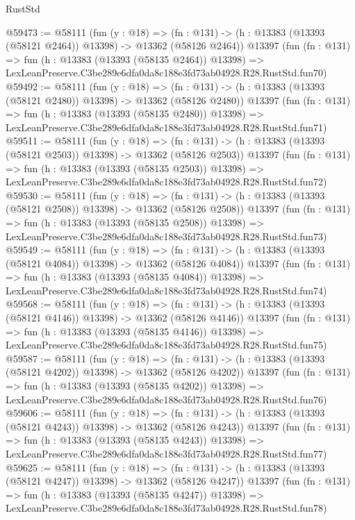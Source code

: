 \begin{lexlean}{RustStd}
\begin{coremodule}
@59473 := @58111
    (fun (y : @18) =>
    (fn : @131) -> (h : @13383 (@13393 (@58121 @2464)) @13398) -> @13362 (@58126 @2464))
    @13397
    (fun (fn : @131) =>
    fun (h : @13383 (@13393 (@58135 @2464)) @13398) =>
    LexLeanPreserve.C3be289e6dfa0da8c188e3fd73ab04928.R28.RustStd.fun70)
@59492 := @58111
    (fun (y : @18) =>
    (fn : @131) -> (h : @13383 (@13393 (@58121 @2480)) @13398) -> @13362 (@58126 @2480))
    @13397
    (fun (fn : @131) =>
    fun (h : @13383 (@13393 (@58135 @2480)) @13398) =>
    LexLeanPreserve.C3be289e6dfa0da8c188e3fd73ab04928.R28.RustStd.fun71)
@59511 := @58111
    (fun (y : @18) =>
    (fn : @131) -> (h : @13383 (@13393 (@58121 @2503)) @13398) -> @13362 (@58126 @2503))
    @13397
    (fun (fn : @131) =>
    fun (h : @13383 (@13393 (@58135 @2503)) @13398) =>
    LexLeanPreserve.C3be289e6dfa0da8c188e3fd73ab04928.R28.RustStd.fun72)
@59530 := @58111
    (fun (y : @18) =>
    (fn : @131) -> (h : @13383 (@13393 (@58121 @2508)) @13398) -> @13362 (@58126 @2508))
    @13397
    (fun (fn : @131) =>
    fun (h : @13383 (@13393 (@58135 @2508)) @13398) =>
    LexLeanPreserve.C3be289e6dfa0da8c188e3fd73ab04928.R28.RustStd.fun73)
@59549 := @58111
    (fun (y : @18) =>
    (fn : @131) -> (h : @13383 (@13393 (@58121 @4084)) @13398) -> @13362 (@58126 @4084))
    @13397
    (fun (fn : @131) =>
    fun (h : @13383 (@13393 (@58135 @4084)) @13398) =>
    LexLeanPreserve.C3be289e6dfa0da8c188e3fd73ab04928.R28.RustStd.fun74)
@59568 := @58111
    (fun (y : @18) =>
    (fn : @131) -> (h : @13383 (@13393 (@58121 @4146)) @13398) -> @13362 (@58126 @4146))
    @13397
    (fun (fn : @131) =>
    fun (h : @13383 (@13393 (@58135 @4146)) @13398) =>
    LexLeanPreserve.C3be289e6dfa0da8c188e3fd73ab04928.R28.RustStd.fun75)
@59587 := @58111
    (fun (y : @18) =>
    (fn : @131) -> (h : @13383 (@13393 (@58121 @4202)) @13398) -> @13362 (@58126 @4202))
    @13397
    (fun (fn : @131) =>
    fun (h : @13383 (@13393 (@58135 @4202)) @13398) =>
    LexLeanPreserve.C3be289e6dfa0da8c188e3fd73ab04928.R28.RustStd.fun76)
@59606 := @58111
    (fun (y : @18) =>
    (fn : @131) -> (h : @13383 (@13393 (@58121 @4243)) @13398) -> @13362 (@58126 @4243))
    @13397
    (fun (fn : @131) =>
    fun (h : @13383 (@13393 (@58135 @4243)) @13398) =>
    LexLeanPreserve.C3be289e6dfa0da8c188e3fd73ab04928.R28.RustStd.fun77)
@59625 := @58111
    (fun (y : @18) =>
    (fn : @131) -> (h : @13383 (@13393 (@58121 @4247)) @13398) -> @13362 (@58126 @4247))
    @13397
    (fun (fn : @131) =>
    fun (h : @13383 (@13393 (@58135 @4247)) @13398) =>
    LexLeanPreserve.C3be289e6dfa0da8c188e3fd73ab04928.R28.RustStd.fun78)

\end{coremodule}
\end{lexlean}
